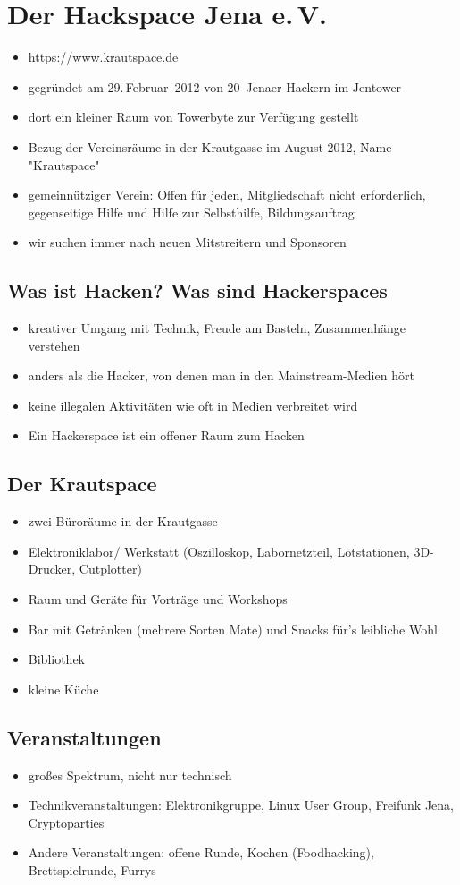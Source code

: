 \documentclass[a4paper,12pt,twoside]{scrartcl}
\begin{document}
\thispagestyle{empty}
\section*{Der Hackspace Jena e.\,V.}
\begin{itemize}
\item https://www.krautspace.de
\item gegründet am 29.\,Februar~2012 von 20~Jenaer Hackern im Jentower
\item dort ein kleiner Raum von Towerbyte zur Verfügung gestellt
\item Bezug der Vereinsräume in der Krautgasse im August 2012, Name "Krautspace"
\item gemeinnütziger Verein: Offen für jeden, Mitgliedschaft nicht erforderlich, gegenseitige Hilfe und Hilfe zur Selbsthilfe, Bildungsauftrag
\item wir suchen immer nach neuen Mitstreitern und Sponsoren
\end{itemize}
\subsection*{Was ist Hacken? Was sind Hackerspaces}
\begin{itemize}
\item kreativer Umgang mit Technik, Freude am Basteln, Zusammenhänge verstehen
\item anders als die Hacker, von denen man in den Mainstream-Medien hört
\item keine illegalen Aktivitäten wie oft in Medien verbreitet wird
\item Ein Hackerspace ist ein offener Raum zum Hacken
\end{itemize}
\subsection*{Der Krautspace}
\begin{itemize}
\item zwei Büroräume in der Krautgasse
\item Elektroniklabor/ Werkstatt (Oszilloskop, Labornetzteil, Lötstationen, 3D-Drucker, Cutplotter)
\item Raum und Geräte für Vorträge und Workshops
\item Bar mit Getränken (mehrere Sorten Mate) und Snacks für's leibliche Wohl
\item Bibliothek
\item kleine Küche
\end{itemize}
\subsection*{Veranstaltungen}
\begin{itemize}
\item großes Spektrum, nicht nur technisch
\item Technikveranstaltungen: Elektronikgruppe, Linux User Group, Freifunk Jena, Cryptoparties
\item Andere Veranstaltungen: offene Runde, Kochen (Foodhacking), Brettspielrunde,  Furrys
\end{itemize}
\end{document}
